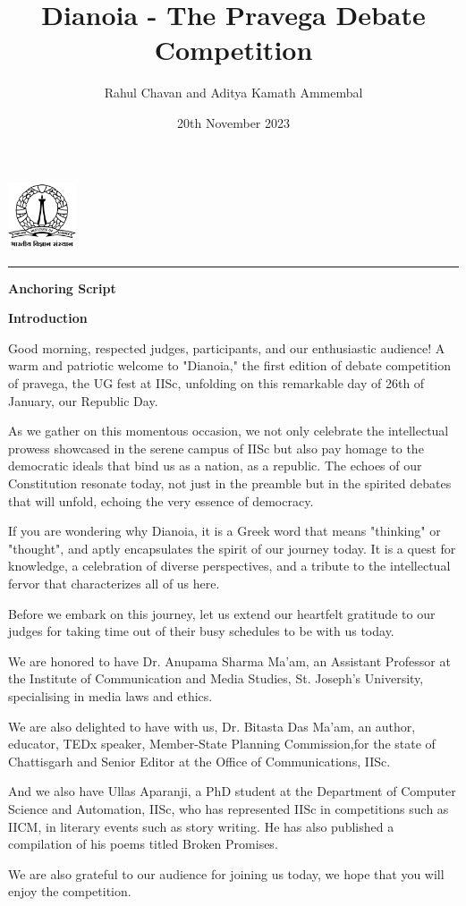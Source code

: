 \documentclass{report}
\title{\textbf{Dianoia - The Pravega Debate Competition}}
\author{Rahul Chavan and Aditya Kamath Ammembal}
\date{20th November 2023}
\renewcommand{\maketitle}{
 \begin{center}
    \includegraphics[width=2cm]{IISc_Master_Seal_Black.jpg}
    \vspace{0.5cm}

    \Large
    \textbf{\thetitle}
    
    \vspace{0.5cm}
    
    \Large
    \theauthor
    
    \vspace{0.2cm}
    
    \large
    \thedate

    \vspace{0.5cm}

    \hrule  
    
  \end{center}
}
\begin{document}
\maketitle
\begin{center}
    \Large
    \textbf{Anchoring Script}
\end{center} 

\begin{center}
    \large
    \textbf{Introduction}
\end{center}

Good morning, respected judges, participants, and our enthusiastic audience! 
A warm and patriotic welcome to "Dianoia," the first edition of debate competition of pravega, the UG fest at IISc, 
unfolding on this remarkable day of 26th of January, our Republic Day.

As we gather on this momentous occasion, we not only celebrate the intellectual prowess showcased in the serene campus of IISc 
but also pay homage to the democratic ideals that bind us as a nation, as a republic. The echoes of our Constitution resonate today, 
not just in the preamble but in the spirited debates that will unfold, echoing the very essence of democracy.

If you are wondering why Dianoia, it is a Greek word that means "thinking" or "thought", and aptly
encapsulates the spirit of our journey today. It is a quest for knowledge, a celebration of diverse perspectives, 
and a tribute to the intellectual fervor that characterizes all of us here.

Before we embark on this journey, let us extend our heartfelt gratitude to our judges for taking time out of their busy schedules
to be with us today.

We are honored to have Dr. Anupama Sharma Ma'am, an Assistant Professor at the Institute of Communication and Media Studies, St. Joseph's University,
specialising in media laws and ethics. 

We are also delighted to have with us, Dr. Bitasta Das Ma'am, an author, educator, TEDx speaker, Member-State Planning Commission,for 
the state of Chattisgarh and Senior Editor at the Office of Communications, IISc.


And we also have Ullas Aparanji, a PhD student at the Department of Computer Science and Automation, IISc, who has represented IISc in competitions such as IICM,
in literary events such as story writing. He has also published a compilation of his poems titled Broken Promises.

We are also grateful to our audience for joining us today, we hope that you will enjoy the competition.
\end{document}
